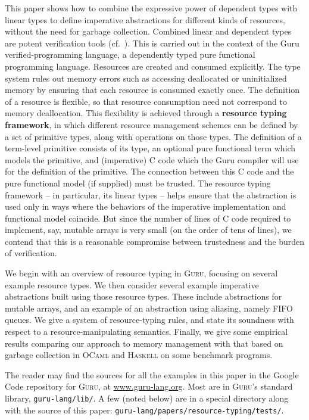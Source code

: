 \documentclass[9pt,natbib]{sigplanconf}
\begin{document}
This paper shows how to combine the expressive power of dependent
types with linear types to define imperative abstractions for
different kinds of resources, without the need for garbage collection.
Combined linear and dependent types are potent verification tools
(cf.~\cite{swamy+09,zhu+05}).  This is carried out in the context of
the Guru verified-programming language, a dependently typed pure
functional programming language.  Resources are created and consumed
explicitly.  The type system rules out memory errors such as accessing
deallocated or uninitialized memory by ensuring that each resource is
consumed exactly once.  The definition of a resource is flexible, so
that resource consumption need not correspond to memory deallocation.
This flexibility is achieved through a \textbf{resource typing
  framework}, in which different resource management schemes can be
defined by a set of primitive types, along with operations on those
types.  The definition of a term-level primitive consists of its type,
an optional pure functional term which models the primitive, and
(imperative) C code which the Guru compiler will use for the
definition of the primitive.  The connection between this C code and
the pure functional model (if supplied) must be trusted.  The resource
typing framework -- in particular, its linear types -- helps ensure
that the abstraction is used only in ways where the behaviors of the
imperative implementation and functional model coincide.  But since
the number of lines of C code required to implement, say, mutable
arrays is very small (on the order of tens of lines), we contend that
this is a reasonable compromise between trustedness and the burden of
verification.

We begin with an overview of resource typing in \textsc{Guru},
focusing on several example resource types.  We then consider several
example imperative abstractions built using those resource types.
These include abstractions for mutable arrays, and an example of an
abstraction using aliasing, namely FIFO queues.  We give a system of
resource-typing rules, and state its soundness with respect to a
resource-manipulating semantics.  Finally, we give some empirical
results comparing our approach to memory management with that based on
garbage collection in \textsc{OCaml} and \textsc{Haskell} on some
benchmark programs.

The reader may find the sources for all the examples in this paper in
the Google Code repository for \textsc{Guru}, at
\url{www.guru-lang.org}.  Most are in \textsc{Guru}'s standard
library, \texttt{guru-lang/lib/}.  A few (noted below) are in a
special directory along with the source of this paper: \texttt{guru-lang/papers/resource-typing/tests/}.
\end{document}
